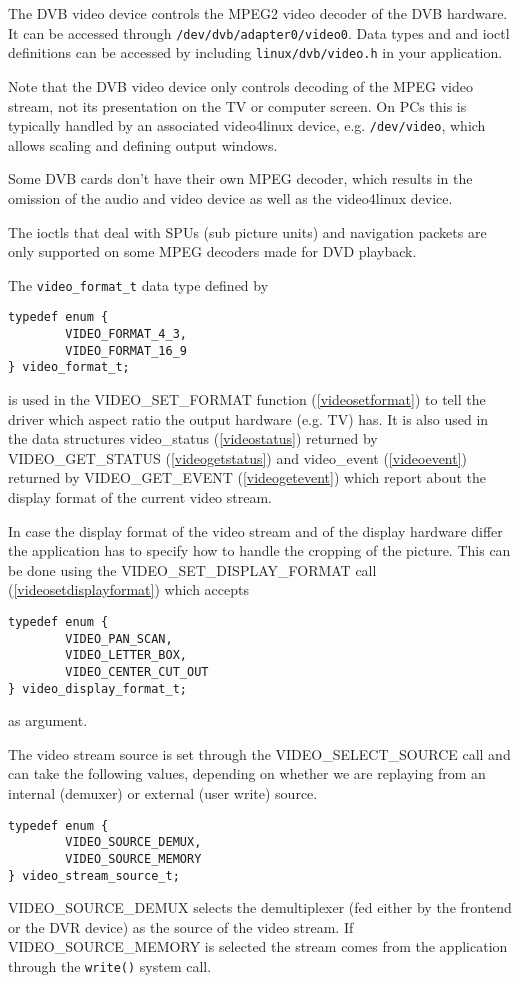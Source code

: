 
The DVB video device controls the MPEG2 video decoder of the DVB hardware.
It can be accessed through \texttt{/dev/dvb/adapter0/video0}.
Data types and and ioctl definitions can be accessed by including
\texttt{linux/dvb/video.h} in your application.


Note that the DVB video device only controls decoding of the MPEG
video stream, not its presentation on the TV or computer screen.
On PCs this is typically handled by an associated video4linux device, e.g.
\texttt{/dev/video}, which allows scaling and defining output windows.

Some DVB cards don't have their own MPEG decoder, which results in the omission
of the audio and video device as well as the video4linux device.

The ioctls that deal with SPUs (sub picture units) and navigation
packets are only supported on some MPEG decoders made for DVD playback.



\label{videoformat}

The \texttt{video\_format\_t} data type defined by 
\begin{verbatim}
typedef enum {
        VIDEO_FORMAT_4_3,
        VIDEO_FORMAT_16_9
} video_format_t;
\end{verbatim}
is used in the VIDEO\_SET\_FORMAT function (\ref{videosetformat}) to 
tell the driver which aspect ratio the output hardware (e.g. TV) has.
It is also used in the data structures video\_status (\ref{videostatus})
returned by VIDEO\_GET\_STATUS  (\ref{videogetstatus}) and
video\_event (\ref{videoevent}) returned by VIDEO\_GET\_EVENT (\ref{videogetevent}) 
which report about the display format of the current video stream.

\label{videodispformat}

In case the display format of the video stream and of the 
display hardware differ the application has to specify how to handle 
the cropping of the picture.
This can be done using the VIDEO\_SET\_DISPLAY\_FORMAT call
(\ref{videosetdisplayformat}) which accepts 
\begin{verbatim}
typedef enum {   
        VIDEO_PAN_SCAN,   
        VIDEO_LETTER_BOX, 
        VIDEO_CENTER_CUT_OUT
} video_display_format_t;
\end{verbatim}
as argument.


\label{videostreamsource}
The video stream source is set through the VIDEO\_SELECT\_SOURCE
call and can take the following values, depending on whether we are
replaying from an internal (demuxer) or external (user write) source.
\begin{verbatim}
typedef enum {
        VIDEO_SOURCE_DEMUX, 
        VIDEO_SOURCE_MEMORY 
} video_stream_source_t;
\end{verbatim}
VIDEO\_SOURCE\_DEMUX selects the demultiplexer (fed
either by the frontend or the DVR device) as the source of 
the video stream.
If VIDEO\_SOURCE\_MEMORY is selected the stream 
comes from the application through the \texttt{write()} 
system call.

